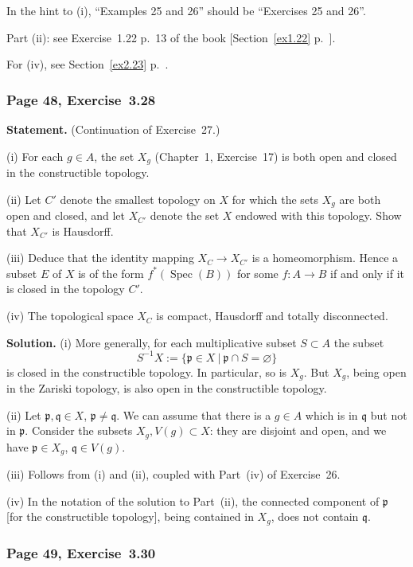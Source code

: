 \documentclass[12pt,letterpaper]{article}%
\newcommand{\mf}{\mathfrak}
\newcommand{\ppp}{\mf p}
\newcommand{\qqq}{\mf q}
\newcommand{\Spec}{\operatorname{Spec}}\newcommand{\Sp}{\operatorname{Spec}}
\newcommand{\nn}{\noindent}
\begin{document}
In the hint to (i), ``Examples 25 and 26'' should be ``Exercises 25 and 26''. 

\nn Part (ii): see Exercise~1.22 p.~13 of the book [Section~\ref{ex1.22} p.~\pageref{ex1.22}]. 

\nn For (iv), see Section~\ref{ex2.23} p.~\pageref{ex2.23}.

\subsubsection{Page 48, Exercise~3.28}%

\textbf{Statement.} (Continuation of Exercise~27.)

\nn(i) For each $g\in A$, the set $X_g$ (Chapter~1, Exercise~17) is both open and closed
in the constructible topology.

\nn(ii) Let $C'$ denote the smallest topology on $X$ for which the sets $X_g$ are both open
and closed, and let $X_{C'}$ denote the set $X$ endowed with this topology. Show
that $X_{C'}$ is Hausdorff.

\nn(iii) Deduce that the identity mapping $X_C\to X_{C'}$ is a homeomorphism. Hence a
subset $E$ of $X$ is of the form $f^*(\Spec(B))$ for some $f: A\to B$ if and only if it
is closed in the topology $C'$.

\nn(iv) The topological space $X_C$ is compact, Hausdorff and totally disconnected.

\nn\textbf{Solution.} (i) More generally, for each multiplicative subset $S\subset A$ the subset 
$$
S^{-1}X:=\{\ppp\in X\ |\ \ppp\cap S=\varnothing\}
$$ 
is closed
in the constructible topology. In particular, so is $X_g$. But $X_g$, being open in the Zariski topology, is also open in the constructible topology.

\nn(ii) Let $\ppp,\qqq\in X$, $\ppp\ne\qqq$. We can assume that there is a $g\in A$ which is in $\qqq$ but not in $\ppp$. Consider the subsets $X_g,V(g)\subset X$: they are disjoint and open, and we have $\ppp\in X_g$, $\qqq\in V(g)$.

\nn(iii) Follows from (i) and (ii), coupled with Part~(iv) of Exercise~26.

\nn(iv) In the notation of the solution to Part~(ii), the connected component of $\ppp$ [for the constructible topology], being contained in $X_g$, does not contain $\qqq$.

\subsubsection{Page 49, Exercise~3.30}%
\end{document}
